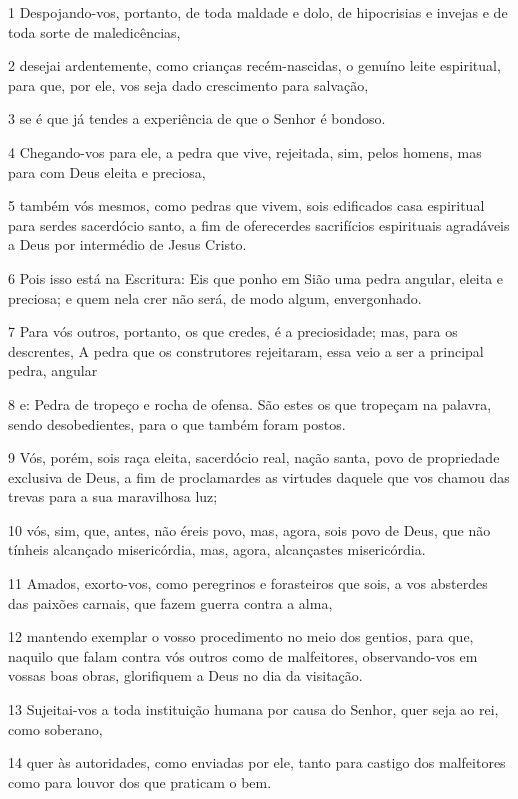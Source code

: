 \par 1 Despojando-vos, portanto, de toda maldade e dolo, de hipocrisias e invejas e de toda sorte de maledicências,
\par 2 desejai ardentemente, como crianças recém-nascidas, o genuíno leite espiritual, para que, por ele, vos seja dado crescimento para salvação,
\par 3 se é que já tendes a experiência de que o Senhor é bondoso.
\par 4 Chegando-vos para ele, a pedra que vive, rejeitada, sim, pelos homens, mas para com Deus eleita e preciosa,
\par 5 também vós mesmos, como pedras que vivem, sois edificados casa espiritual para serdes sacerdócio santo, a fim de oferecerdes sacrifícios espirituais agradáveis a Deus por intermédio de Jesus Cristo.
\par 6 Pois isso está na Escritura: Eis que ponho em Sião uma pedra angular, eleita e preciosa; e quem nela crer não será, de modo algum, envergonhado.
\par 7 Para vós outros, portanto, os que credes, é a preciosidade; mas, para os descrentes, A pedra que os construtores rejeitaram, essa veio a ser a principal pedra, angular
\par 8 e: Pedra de tropeço e rocha de ofensa. São estes os que tropeçam na palavra, sendo desobedientes, para o que também foram postos.
\par 9 Vós, porém, sois raça eleita, sacerdócio real, nação santa, povo de propriedade exclusiva de Deus, a fim de proclamardes as virtudes daquele que vos chamou das trevas para a sua maravilhosa luz;
\par 10 vós, sim, que, antes, não éreis povo, mas, agora, sois povo de Deus, que não tínheis alcançado misericórdia, mas, agora, alcançastes misericórdia.
\par 11 Amados, exorto-vos, como peregrinos e forasteiros que sois, a vos absterdes das paixões carnais, que fazem guerra contra a alma,
\par 12 mantendo exemplar o vosso procedimento no meio dos gentios, para que, naquilo que falam contra vós outros como de malfeitores, observando-vos em vossas boas obras, glorifiquem a Deus no dia da visitação.
\par 13 Sujeitai-vos a toda instituição humana por causa do Senhor, quer seja ao rei, como soberano,
\par 14 quer às autoridades, como enviadas por ele, tanto para castigo dos malfeitores como para louvor dos que praticam o bem.
